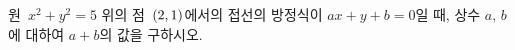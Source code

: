 원~$x^2+y^2=5$ 위의 점~$(2{,}\mkern3mu\mathopen{}1)$에서의 접선의 방정식이 $ax+y+b=0$일 때, 상수 $a$, $b$에 대하여 $a+b$의 값을 구하시오.
